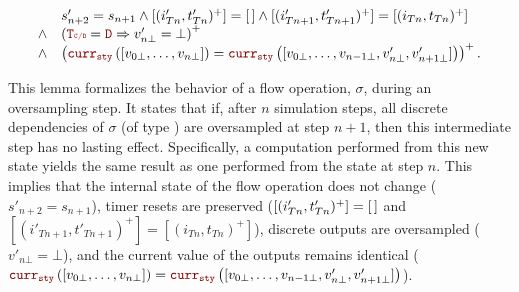 \begin{lemma}
\begin{multline*}
        \begin{array}{ll}
                   & s'_{n+2} = s_{n+1} \wedge [(i'_{Tn}, t'_{Tn})^+] = \emptylist \wedge [(i'_{Tn+1}, t'_{Tn+1})^+] = [(i_{Tn}, t_{Tn})^+]                  \\
            \wedge & \left(\rType = \dType \Rightarrow v'_{n\bot} = \bot\right)^+                                                                            \\
            \wedge & \left(\CurrVal{sty}{[v_{0\bot}, \dots, v_{n\bot}]} = \CurrVal{sty}{[v_{0\bot}, \dots, v_{n-1\bot}, v'_{n\bot}, v'_{n+1\bot}]}\right)^+.
        \end{array}
    \end{multline*}

    This lemma formalizes the behavior of a flow operation, $\sigma$, during an oversampling step.
    It states that if, after $n$ simulation steps, all discrete dependencies of $\sigma$
    (of type \dType) are oversampled at step $n+1$, then this intermediate step has no lasting
    effect. Specifically, a computation performed from this new state yields the same result as
    one performed from the state at step $n$. This implies that the internal state of the flow
    operation does not change ($s'_{n+2} = s_{n+1}$), timer resets are preserved
    ($[(i'_{Tn}, t'_{Tn})^+] = [\,]$ and $[(i'_{Tn+1}, t'_{Tn+1})^+] = [(i_{Tn}, t_{Tn})^+]$),
    discrete outputs are oversampled ($v'_{n\bot} = \bot$), and the current value of the outputs
    remains identical ($\CurrVal{sty}{[v_{0\bot}, \dots, v_{n\bot}]} =
        \CurrVal{sty}{[v_{0\bot}, \dots, v_{n-1\bot}, v'_{n\bot}, v'_{n+1\bot}]}$).
\end{lemma}
